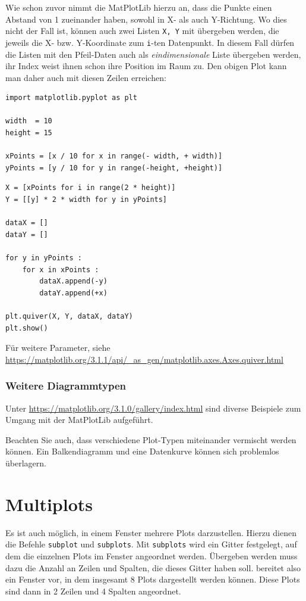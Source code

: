 Wie schon zuvor nimmt die MatPlotLib hierzu an, dass die Punkte einen Abstand von 1 zueinander haben, sowohl in X- als auch Y-Richtung. Wo dies nicht der Fall ist, können auch zwei Listen \texttt{X, Y} mit übergeben werden, die jeweils die X- bzw. Y-Koordinate zum \texttt{i}-ten Datenpunkt. In diesem Fall dürfen die Listen mit den Pfeil-Daten auch als \emph{eindimensionale} Liste übergeben werden, \ie ihr Index weist ihnen schon ihre Position im Raum zu. Den obigen Plot kann man daher auch mit diesen Zeilen erreichen:

\begin{codebox}
\begin{verbatim}
import matplotlib.pyplot as plt

width  = 10
height = 15

xPoints = [x / 10 for x in range(- width, + width)]
yPoints = [y / 10 for y in range(-height, +height)]
\end{verbatim}
\end{codebox}
%
\begin{codebox}[]
\begin{verbatim}
X = [xPoints for i in range(2 * height)]
Y = [[y] * 2 * width for y in yPoints]

dataX = []
dataY = []

for y in yPoints :
    for x in xPoints :
        dataX.append(-y)
        dataY.append(+x)

plt.quiver(X, Y, dataX, dataY)
plt.show()
\end{verbatim}
\end{codebox}

Für weitere Parameter, siehe \url{https://matplotlib.org/3.1.1/api/_as_gen/matplotlib.axes.Axes.quiver.html}

\subsubsection{Weitere Diagrammtypen}
Unter \url{https://matplotlib.org/3.1.0/gallery/index.html} sind diverse Beispiele zum Umgang mit der MatPlotLib aufgeführt.

Beachten Sie auch, dass verschiedene Plot-Typen miteinander vermischt werden können. Ein Balkendiagramm und eine Datenkurve können sich problemlos überlagern.

\section{Multiplots}
Es ist auch möglich, in einem Fenster mehrere Plots darzustellen. Hierzu dienen die Befehle \texttt{subplot} und \texttt{subplots}. Mit \texttt{subplots} wird ein Gitter festgelegt, auf dem die einzelnen Plots im Fenster angeordnet werden. Übergeben werden muss dazu die Anzahl an Zeilen und Spalten, die dieses Gitter haben soll.
bereitet also ein Fenster vor, in dem insgesamt 8 Plots dargestellt werden können. Diese Plots sind dann in 2 Zeilen und 4 Spalten angeordnet.

